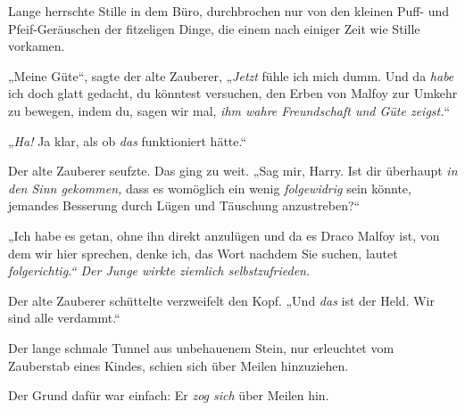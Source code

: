 Lange herrschte Stille in dem Büro, durchbrochen nur von den kleinen Puff- und Pfeif-Geräuschen der fitzeligen Dinge, die einem nach einiger Zeit wie Stille vorkamen.

„Meine Güte“, sagte der alte Zauberer, „\emph{Jetzt} fühle ich mich dumm. Und da \emph{habe} ich doch glatt gedacht, du könntest versuchen, den Erben von Malfoy zur Umkehr zu bewegen, indem du, sagen wir mal, \emph{ihm wahre Freundschaft und Güte zeigst.}“

„\emph{Ha!} Ja klar, als ob \emph{das} funktioniert hätte.“

Der alte Zauberer seufzte. Das ging zu weit. „Sag mir, Harry. Ist dir überhaupt \emph{in den Sinn gekommen,} dass es womöglich ein wenig \emph{folgewidrig} sein könnte, jemandes Besserung durch Lügen und Täuschung anzustreben?“

„Ich habe es getan, ohne ihn direkt anzulügen und da es Draco Malfoy ist, von dem wir hier sprechen, denke ich, das Wort nachdem Sie suchen, lautet \emph{folgerichtig.“ Der Junge wirkte ziemlich selbstzufrieden.}

Der alte Zauberer schüttelte verzweifelt den Kopf. „Und \emph{das} ist der Held. Wir sind alle verdammt.“


Der lange schmale Tunnel aus unbehauenem Stein, nur erleuchtet vom Zauberstab eines Kindes, schien sich über Meilen hinzuziehen.

Der Grund dafür war einfach: Er \emph{zog sich} über Meilen hin.


